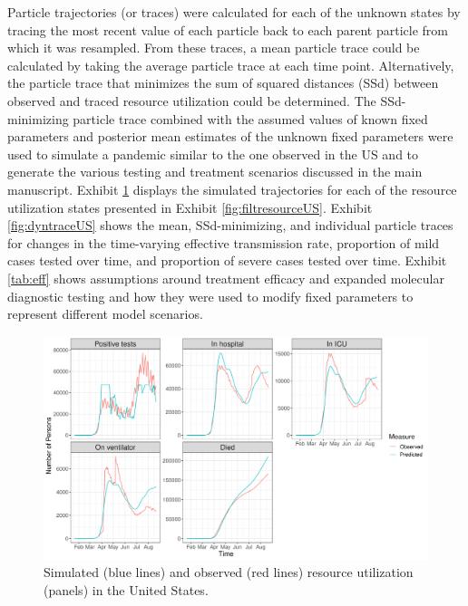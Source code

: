 \documentclass{article}
\begin{document}
Particle trajectories (or traces) were calculated for each of the unknown states by tracing the most recent value of each particle back to each parent particle from which it was resampled. From these traces, a mean particle trace could be calculated by taking the average particle trace at each time point. Alternatively, the particle trace that minimizes the sum of squared distances (SSd) between observed and traced resource utilization could be determined. The SSd-minimizing particle trace combined with the assumed values of known fixed parameters and posterior mean estimates of the unknown fixed parameters were used to simulate a pandemic similar to the one observed in the US and to generate the various testing and treatment scenarios discussed in the main manuscript. Exhibit \ref{fig:traceUS} displays the simulated trajectories for each of the resource utilization states presented in Exhibit \ref{fig:filtresourceUS}. Exhibit \ref{fig:dyntraceUS} shows the mean, SSd-minimizing, and individual particle traces for changes in the time-varying effective transmission rate, proportion of mild cases tested over time, and proportion of severe cases tested over time. Exhibit \ref{tab:eff} shows assumptions around treatment efficacy and expanded molecular diagnostic testing and how they were used to modify fixed parameters to represent different model scenarios.

\begin{figure}
\centering
\includegraphics[width=1.0\textwidth]{figures/covid_pf_US_500000_observedTrace-2020-08-26}
\caption{Simulated (blue lines) and observed (red lines) resource utilization (panels) in the United States.} \label{fig:traceUS}
\end{figure}
\end{document}
